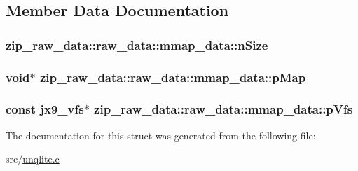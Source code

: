 \subsection{Member Data Documentation}
\hypertarget{structzip__raw__data_1_1raw__data_1_1mmap__data_ac49936b557475026b7c18b330f0095cc}{
\subsubsection[{n\-Size}]{ zip\-\_\-raw\-\_\-data\-::raw\-\_\-data\-::mmap\-\_\-data\-::n\-Size}}\label{d0/d58/structzip__raw__data_1_1raw__data_1_1mmap__data_ac49936b557475026b7c18b330f0095cc}
\hypertarget{structzip__raw__data_1_1raw__data_1_1mmap__data_a9e4edea7d7507af12297e864453db6d3}{
\subsubsection[{p\-Map}]{\setlength{\rightskip}{0pt plus 5cm}void$\ast$ zip\-\_\-raw\-\_\-data\-::raw\-\_\-data\-::mmap\-\_\-data\-::p\-Map}}\label{d0/d58/structzip__raw__data_1_1raw__data_1_1mmap__data_a9e4edea7d7507af12297e864453db6d3}
\hypertarget{structzip__raw__data_1_1raw__data_1_1mmap__data_a2d11521c7e9b136952c30d9940024ff9}{
\subsubsection[{p\-Vfs}]{\setlength{\rightskip}{0pt plus 5cm}const {\bf jx9\-\_\-vfs}$\ast$ zip\-\_\-raw\-\_\-data\-::raw\-\_\-data\-::mmap\-\_\-data\-::p\-Vfs}}\label{d0/d58/structzip__raw__data_1_1raw__data_1_1mmap__data_a2d11521c7e9b136952c30d9940024ff9}


The documentation for this struct was generated from the following file\-:\begin{DoxyCompactItemize}
\item 
src/\hyperlink{unqlite_8c}{unqlite.\-c}\end{DoxyCompactItemize}

